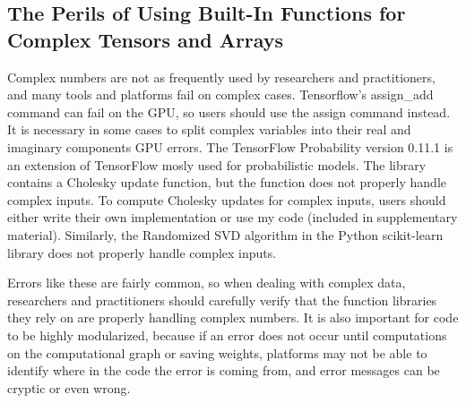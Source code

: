 \subsection{The Perils of Using Built-In Functions for Complex Tensors and Arrays}
Complex numbers are not as frequently used by researchers and practitioners, and many tools and platforms fail on complex cases.  Tensorflow's assign\_add command can fail on the GPU, so users should use the assign command instead. It is necessary in some cases to split complex variables into their real and imaginary components GPU errors. 
The TensorFlow Probability version 0.11.1 \cite{tensorflowprobability} is an extension of TensorFlow mosly used for probabilistic models. The library contains a Cholesky update function, but the function does not properly handle complex inputs. To compute Cholesky updates for complex inputs, users should either write their own implementation or use my code (included in supplementary material). Similarly, the Randomized SVD algorithm in the Python scikit-learn library does not properly handle complex inputs.

Errors like these are fairly common, so when dealing with complex data, researchers and practitioners should carefully verify that the function libraries they rely on are properly handling complex numbers. It is also important for code to be highly modularized, because if an error does not occur until computations on the computational graph or saving weights, platforms may not be able to identify where in the code the error is coming from, and error messages can be cryptic or even wrong.
